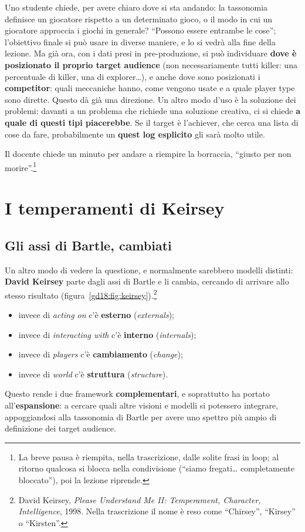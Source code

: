 Uno studente chiede, per avere chiaro dove si sta andando: la tassonomia definisce
un giocatore rispetto a un determinato gioco, o il modo in cui un giocatore
approccia i giochi in generale? ``Possono essere entrambe le cose''; l'obiettivo
finale si può usare in diverse maniere, e lo si vedrà alla fine della lezione. Ma già
ora, con i dati presi in pre-produzione, si può individuare \textbf{dove è
posizionato il proprio target audience} (non necessariamente tutti killer: una
percentuale di killer, una di explorer\dots), e anche dove sono posizionati i
\textbf{competitor}: quali meccaniche hanno, come vengono usate e a quale player type
sono dirette. Questo dà già una direzione. Un altro modo d'uso è la soluzione dei
problemi: davanti a un problema che richiede una soluzione creativa, ci si chiede
\textbf{a quale di questi tipi piacerebbe}. Se il target è l'achiever, che cerca una
lista di cose da fare, probabilmente un \textbf{quest log esplicito} gli sarà molto
utile.

Il docente chiede un minuto per andare a riempire la borraccia, ``giusto per non
morire''.\footnote{La breve pausa è riempita, nella trascrizione, dalle solite frasi
in loop; al ritorno qualcosa si blocca nella condivisione (``siamo fregati\dots
completamente bloccato''), poi la lezione riprende.}

\section{I temperamenti di Keirsey}
\label{gd18:sec:keirsey}


\subsection{Gli assi di Bartle, cambiati}

Un altro modo di vedere la questione, e normalmente sarebbero modelli distinti:
\textbf{David Keirsey} parte dagli assi di Bartle e li cambia, cercando di arrivare
allo stesso risultato (figura~\ref{gd18:fig:keirsey}).\footnote{David Keirsey,
\emph{Please Understand Me II: Temperament, Character, Intelligence}, 1998. Nella
trascrizione il nome è reso come ``Chirsey'', ``Kirsey'' o ``Kirsten''.}
\begin{itemize}
  \item invece di \emph{acting on} c'è \textbf{esterno} (\emph{externals});
  \item invece di \emph{interacting with} c'è \textbf{interno} (\emph{internals});
  \item invece di \emph{players} c'è \textbf{cambiamento} (\emph{change});
  \item invece di \emph{world} c'è \textbf{struttura} (\emph{structure}).
\end{itemize}
Questo rende i due framework \textbf{complementari}, e soprattutto ha portato
all'\textbf{espansione}: a cercare quali altre visioni e modelli si potessero
integrare, appoggiandosi alla tassonomia di Bartle per avere uno spettro più ampio
di definizione dei target audience.

